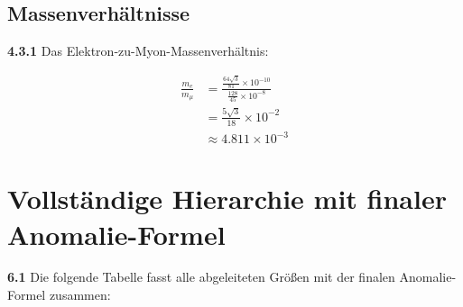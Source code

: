 	\subsection{Massenverhältnisse}
	
	\noindent \textbf{4.3.1} Das Elektron-zu-Myon-Massenverhältnis:
	\begin{keyresult}
		\begin{align}
			\frac{m_e}{m_\mu} &= \frac{\frac{64 \sqrt{3}}{81} \times 10^{-10}}{\frac{128}{45} \times 10^{-8}} \\
			&= \frac{5 \sqrt{3}}{18} \times 10^{-2} \\
			&\approx 4.811 \times 10^{-3}
		\end{align}
	\end{keyresult}


	\section{Vollständige Hierarchie mit finaler Anomalie-Formel}
	
	\noindent \textbf{6.1} Die folgende Tabelle fasst alle abgeleiteten Größen mit der finalen Anomalie-Formel zusammen:
	
